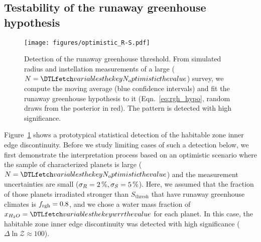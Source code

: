\documentclass[twocolumn,twocolappendix,linenumbers]{aastex631}
\begin{document}
\subsection{Testability of the runaway greenhouse hypothesis}\label{sec:res_testability}
\begin{figure}[ht!]
    \begin{centering}
        \texttt{[image: figures/optimistic\_R-S.pdf]}
        \caption{
        Detection of the runaway greenhouse threshold.
        From simulated radius and instellation measurements of a large ($N = \var{N_optimistic}$) survey, we compute the moving average (blue confidence intervals) and fit the runaway greenhouse hypothesis to it (Eqn.~\ref{eq:rgh_hypo}, random draws from the posterior in red).
            The pattern is detected with high significance.
        }
        \label{fig:optimistic_R-S}
    \end{centering}
\end{figure}
Figure~\ref{fig:optimistic_R-S} shows a prototypical statistical detection of the habitable zone inner edge discontinuity.
Before we study limiting cases of such a detection below, we first demonstrate the interpretation process based on an optimistic scenario where the sample of characterized planets is large ($N = \var{N_optimistic}$) and the measurement uncertainties are small ($\sigma_{R} = \SI{2}{\percent}, \sigma_{S} = \SI{5}{\percent}$).
Here, we assumed that the fraction of those planets irradiated stronger than $S_\mathrm{thresh}$ that have runaway greenhouse climates is $f_\mathrm{rgh} = 0.8$, and we chose a water mass fraction of $x_{H_2O} = \var{wrr}$ for each planet.
In this case, the habitable zone inner edge discontinuity was detected with high significance ($\Delta \ln \mathcal{Z} \approx 100$).
\end{document}
